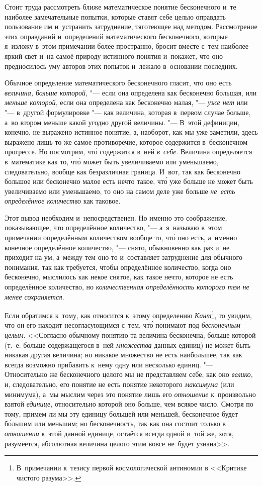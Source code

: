 Стоит труда рассмотреть ближе математическое понятие бесконечного и~те наиболее
замечательные попытки, которые ставят себе целью оправдать пользование им
и~устранить затруднение, тяготеющее над методом. Рассмотрение этих оправданий
и~определений математического бесконечного, которые я~изложу в~этом примечании
более пространно, бросит вместе с~тем наиболее яркий свет и~на самоё природу
истинного понятия и~покажет, что оно предносилось уму авторов этих попыток
и~лежало в~основании последних.

Обычное определение математического бесконечного гласит, что оно есть
{\em величина, больше которой,} "--- если она определена как бесконечно
большая, или {\em меньше которой,} если она определена как бесконечно малая,
"--- {\em уже нет} или "--- в~другой формулировке "--- как величина, которая
в~первом случае больше, а~во втором меньше какой угодно другой величины. "---
В~этой дефиниции, конечно, не выражено истинное понятие, а, наоборот, как мы
уже заметили, здесь выражено лишь то же самое противоречие, которое содержится
в~бесконечном прогрессе. Но посмотрим, чт\'{о} содержится в~ней
{\em в~себе}. Величина определяется в~математике как то, чт\'{о} может быть
увеличиваемо или уменьшаемо, следовательно, вообще как безразличная граница.
И~вот, так как бесконечно большое или бесконечно малое есть нечто такое, чт\'{о}
уже больше не может быть увеличиваемо или уменьшаемо, то оно на самом деле уже
больше {\em не~есть определённое количество} как таковое.

Этот вывод необходим и~непосредственен. Но именно это соображение,
показывающее, что определённое количество, "--- а~я~называю в~этом примечании
определённым количеством вообще то, чт\'{о} оно есть, а~именно конечное определённое количество,
"--- снято, обыкновенно как раз и~не приходит на ум, а~между тем оно-то
и~составляет затруднение для обычного понимания, так как требуется, чтобы
определённое количество, когда оно бесконечно, мыслилось как некое снятое,
как такое нечто, которое не есть определённое количество, но
{\em количественная определённость которого тем не менее сохраняется}.

Если обратимся к~тому, как относится к~этому определению
{\em Кант}\footnote{В~примечании к~тезису первой космологической антиномии
в <<Критике чистого разума>>.}, то увидим, что он его находит несогласующимся
с~тем, чт\'{о} понимают под {\em бесконечным целым}. <<Согласно обычному
понятию та величина бесконечна, больше которой (т.~е. больше содержащегося
в~ней {\em множества} данных единиц) не может быть никакая другая величина; но
никакое множество не есть наибольшее, так как всегда возможно прибавить к~нему
одну или несколько единиц. "--- Относительно же бесконечного целого мы не
представляем себе, как оно {\em велико,} и, следовательно, его понятие не есть
понятие некоторого {\em максимума} (или минимума), а~мы мыслим через это
понятие лишь его {\em отношение} к~произвольно взятой {\em единице,}
относительно которой оно больше, чем всякое число. Смотря по тому, примем ли
мы эту единицу большей или меньшей, бесконечное будет б\'{о}льшим или меньшим; но
бесконечность, так как она состоит только в {\em отношении} к~этой данной
единице, остаётся всегда одной и~той же, хотя, разумеется, абсолютная величина
целого этим вовсе не~будет узнана>>.


